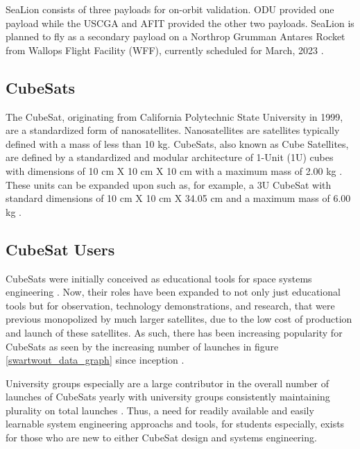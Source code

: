 \documentclass[conf]{new-aiaa}
\begin{document}
SeaLion consists of three payloads for on-orbit validation.  ODU provided one payload while the USCGA and AFIT provided the other two payloads.  SeaLion is planned to fly as a secondary payload on a Northrop Grumman Antares Rocket from Wallops Flight Facility (WFF), currently scheduled for March, 2023 \cite{sealion_cdr}.

\subsection{CubeSats}

The CubeSat, originating from California Polytechnic State University in 1999, are a standardized form of nanosatellites.  Nanosatellites are satellites typically defined with a mass of less than 10 kg.  CubeSats, also known as Cube Satellites, are defined by a standardized and modular architecture of 1-Unit (1U) cubes with dimensions of 10 cm X 10 cm X 10 cm with a maximum mass of 2.00 kg \cite{cds_rev14}.  These units can be expanded upon such as, for example, a 3U CubeSat with standard dimensions of 10 cm X 10 cm X 34.05 cm and a maximum mass of 6.00 kg \cite{cds_rev14}.

\subsection{CubeSat Users}

CubeSats were initially conceived as educational tools for space systems engineering \cite{heidt_new}.  Now, their roles have been expanded to not only just educational tools but for observation, technology demonstrations, and research, that were previous monopolized by much larger satellites, due to the low cost of production and launch of these satellites.  As such, there has been increasing popularity for CubeSats as seen by the increasing number of launches in figure \ref{swartwout_data_graph} since inception \cite{swartwout_data}.

University groups especially are a large contributor in the overall number of launches of CubeSats yearly with university groups consistently maintaining plurality on total launches \cite{swartwout_data}. Thus, a need for readily available and easily learnable system engineering approachs and tools, for students especially, exists for those who are new to either CubeSat design and systems engineering.
\end{document}
